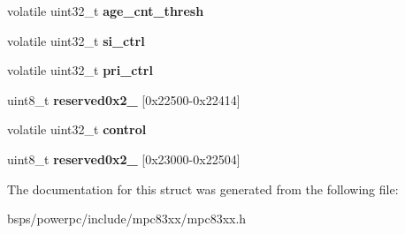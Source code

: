 \begin{DoxyCompactItemize}
\item 
\mbox{\label{structm83xxUSB__MPHRegisters___ae1ae5fd96ec256a5aab8de69bc6d858b}} 
volatile uint32\+\_\+t {\bfseries age\+\_\+cnt\+\_\+thresh}
\item 
\mbox{\label{structm83xxUSB__MPHRegisters___a1c78df455c26896f3f123cff0c54d27f}} 
volatile uint32\+\_\+t {\bfseries si\+\_\+ctrl}
\item 
\mbox{\label{structm83xxUSB__MPHRegisters___a90e24826460e336e71dda5c5ef04226b}} 
volatile uint32\+\_\+t {\bfseries pri\+\_\+ctrl}
\item 
\mbox{\label{structm83xxUSB__MPHRegisters___afcacce4c0cebc219c69e767f6445f8ad}} 
uint8\+\_\+t {\bfseries reserved0x2\+\_} \mbox{[}0x22500-\/0x22414\mbox{]}
\item 
\mbox{\label{structm83xxUSB__MPHRegisters___a9617e14e917a57639ac794b69ea095b0}} 
volatile uint32\+\_\+t {\bfseries control}
\item 
\mbox{\label{structm83xxUSB__MPHRegisters___a5641b53c73a638d82c5deb6dfaae4205}} 
uint8\+\_\+t {\bfseries reserved0x2\+\_} \mbox{[}0x23000-\/0x22504\mbox{]}
\end{DoxyCompactItemize}


The documentation for this struct was generated from the following file\+:\begin{DoxyCompactItemize}
\item 
bsps/powerpc/include/mpc83xx/mpc83xx.\+h\end{DoxyCompactItemize}
